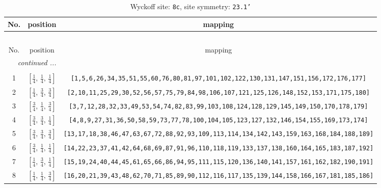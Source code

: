 \documentclass[fleqn,8pt]{jsarticle}
\begin{document}
\begin{longtable}{ccc}
\caption{Wyckoff site: {\tt 8c}, site symmetry: {\tt 23.1'}}
 \\
 \hline \hline
No. & position & mapping \\ \hline \endfirsthead

\multicolumn{2}{l}{\tablename\ \thetable{}} \\
 \hline \hline
No. & position & mapping \\ \hline \endhead

 \hline \hline
\multicolumn{2}{r}{\footnotesize\it continued ...} \\ \endfoot

 \hline \hline
\multicolumn{2}{r}{} \\ \endlastfoot

1 & $\left[ \frac{1}{4},\, \frac{1}{4},\, \frac{1}{4} \right]$ & {\tt [1,5,6,26,34,35,51,55,60,76,80,81,97,101,102,122,130,131,147,151,156,172,176,177]} \\ \hline
2 & $\left[ \frac{1}{4},\, \frac{3}{4},\, \frac{3}{4} \right]$ & {\tt [2,10,11,25,29,30,52,56,57,75,79,84,98,106,107,121,125,126,148,152,153,171,175,180]} \\ \hline
3 & $\left[ \frac{3}{4},\, \frac{1}{4},\, \frac{3}{4} \right]$ & {\tt [3,7,12,28,32,33,49,53,54,74,82,83,99,103,108,124,128,129,145,149,150,170,178,179]} \\ \hline
4 & $\left[ \frac{3}{4},\, \frac{3}{4},\, \frac{1}{4} \right]$ & {\tt [4,8,9,27,31,36,50,58,59,73,77,78,100,104,105,123,127,132,146,154,155,169,173,174]} \\ \hline
5 & $\left[ \frac{3}{4},\, \frac{3}{4},\, \frac{3}{4} \right]$ & {\tt [13,17,18,38,46,47,63,67,72,88,92,93,109,113,114,134,142,143,159,163,168,184,188,189]} \\ \hline
6 & $\left[ \frac{3}{4},\, \frac{1}{4},\, \frac{1}{4} \right]$ & {\tt [14,22,23,37,41,42,64,68,69,87,91,96,110,118,119,133,137,138,160,164,165,183,187,192]} \\ \hline
7 & $\left[ \frac{1}{4},\, \frac{3}{4},\, \frac{1}{4} \right]$ & {\tt [15,19,24,40,44,45,61,65,66,86,94,95,111,115,120,136,140,141,157,161,162,182,190,191]} \\ \hline
8 & $\left[ \frac{1}{4},\, \frac{1}{4},\, \frac{3}{4} \right]$ & {\tt [16,20,21,39,43,48,62,70,71,85,89,90,112,116,117,135,139,144,158,166,167,181,185,186]} \\
\end{longtable}
\renewcommand{\arraystretch}{1.2}
\end{document}
